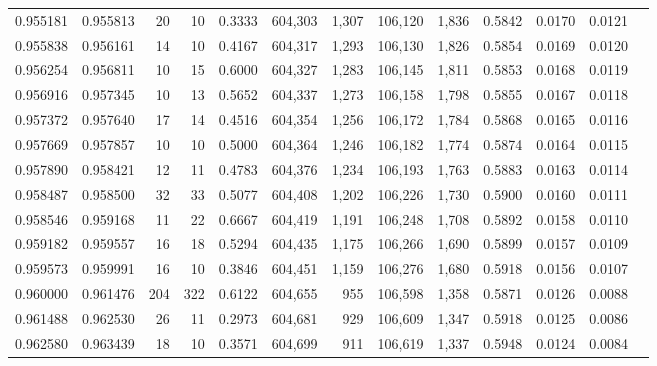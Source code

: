 \begin{tabular}{rrrrrrrrrrrrr}
0.955181 & 0.955813 &    20 &  10 &                                     0.3333 & 604,303 &   1,307 & 106,120 &   1,836 & 0.5842 & 0.0170 & 0.0121 \\
0.955838 & 0.956161 &    14 &  10 &                                     0.4167 & 604,317 &   1,293 & 106,130 &   1,826 & 0.5854 & 0.0169 & 0.0120 \\
0.956254 & 0.956811 &    10 &  15 &                                     0.6000 & 604,327 &   1,283 & 106,145 &   1,811 & 0.5853 & 0.0168 & 0.0119 \\
0.956916 & 0.957345 &    10 &  13 &                                     0.5652 & 604,337 &   1,273 & 106,158 &   1,798 & 0.5855 & 0.0167 & 0.0118 \\
0.957372 & 0.957640 &    17 &  14 &                                     0.4516 & 604,354 &   1,256 & 106,172 &   1,784 & 0.5868 & 0.0165 & 0.0116 \\
0.957669 & 0.957857 &    10 &  10 &                                     0.5000 & 604,364 &   1,246 & 106,182 &   1,774 & 0.5874 & 0.0164 & 0.0115 \\
0.957890 & 0.958421 &    12 &  11 &                                     0.4783 & 604,376 &   1,234 & 106,193 &   1,763 & 0.5883 & 0.0163 & 0.0114 \\
0.958487 & 0.958500 &    32 &  33 &                                     0.5077 & 604,408 &   1,202 & 106,226 &   1,730 & 0.5900 & 0.0160 & 0.0111 \\
0.958546 & 0.959168 &    11 &  22 &                                     0.6667 & 604,419 &   1,191 & 106,248 &   1,708 & 0.5892 & 0.0158 & 0.0110 \\
0.959182 & 0.959557 &    16 &  18 &                                     0.5294 & 604,435 &   1,175 & 106,266 &   1,690 & 0.5899 & 0.0157 & 0.0109 \\
0.959573 & 0.959991 &    16 &  10 &                                     0.3846 & 604,451 &   1,159 & 106,276 &   1,680 & 0.5918 & 0.0156 & 0.0107 \\
0.960000 & 0.961476 &   204 & 322 &                                     0.6122 & 604,655 &     955 & 106,598 &   1,358 & 0.5871 & 0.0126 & 0.0088 \\
0.961488 & 0.962530 &    26 &  11 &                                     0.2973 & 604,681 &     929 & 106,609 &   1,347 & 0.5918 & 0.0125 & 0.0086 \\
0.962580 & 0.963439 &    18 &  10 &                                     0.3571 & 604,699 &     911 & 106,619 &   1,337 & 0.5948 & 0.0124 & 0.0084 \\

\end{tabular}
